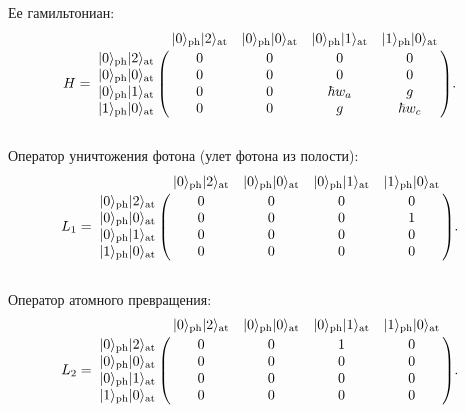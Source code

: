 \noindent Ее гамильтониан:\\
{\normalsize
	\[
	H = \bordermatrix
	{
		&                |0\ra_{\text{\text{ph}}}|2\ra_{\text{\text{at}}} & |0\ra_{\text{\text{ph}}}|0\ra_{\text{\text{at}}} & |0\ra_{\text{\text{ph}}}|1\ra_{\text{\text{at}}} & |1\ra_{\text{\text{ph}}}|0\ra_{\text{\text{at}}} \cr
		|0\ra_{\text{\text{ph}}}|2\ra_{\text{\text{at}}} &      0 &       	   0 &      0 & 0 \cr
		|0\ra_{\text{\text{ph}}}|0\ra_{\text{\text{at}}} &      0 &       	   0 &      0 & 0\cr
		|0\ra_{\text{\text{ph}}}|1\ra_{\text{\text{at}}} &      0 &  		   0 &      \hbar w_{a} & g\cr
		|1\ra_{\text{\text{ph}}}|0\ra_{\text{\text{at}}} &      0 &      	   0 &      g & \hbar w_{c}\cr
	}.
	\]
}
\
\\[18pt]

\noindent Оператор уничтожения фотона (улет фотона из полости):\\
{\normalsize
	\[
	L_{1} = \bordermatrix
	{
		&                |0\ra_{\text{\text{ph}}}|2\ra_{\text{\text{at}}} & |0\ra_{\text{\text{ph}}}|0\ra_{\text{\text{at}}} & |0\ra_{\text{\text{ph}}}|1\ra_{\text{\text{at}}} & |1\ra_{\text{\text{ph}}}|0\ra_{\text{\text{at}}} \cr
		|0\ra_{\text{\text{ph}}}|2\ra_{\text{\text{at}}} &      0 &      0 &      0 & 0 \cr
		|0\ra_{\text{\text{ph}}}|0\ra_{\text{\text{at}}} &      0 &      0 &      0 & 1\cr
		|0\ra_{\text{\text{ph}}}|1\ra_{\text{\text{at}}} &      0 &      0 &      0 & 0\cr
		|1\ra_{\text{\text{ph}}}|0\ra_{\text{\text{at}}} &      0 &      0 &      0 & 0\cr
	}.
	\]
}
\\

\noindent Оператор атомного превращения:\\
{\normalsize
	\[
	L_{2} = \bordermatrix
	{
		&                |0\ra_{\text{\text{ph}}}|2\ra_{\text{\text{at}}} & |0\ra_{\text{\text{ph}}}|0\ra_{\text{\text{at}}} & |0\ra_{\text{\text{ph}}}|1\ra_{\text{\text{at}}} & |1\ra_{\text{\text{ph}}}|0\ra_{\text{\text{at}}} \cr
		|0\ra_{\text{\text{ph}}}|2\ra_{\text{\text{at}}} &      0 &      0 &      1 & 0 \cr
		|0\ra_{\text{\text{ph}}}|0\ra_{\text{\text{at}}} &      0 &      0 &      0 & 0\cr
		|0\ra_{\text{\text{ph}}}|1\ra_{\text{\text{at}}} &      0 &      0 &      0 & 0\cr
		|1\ra_{\text{\text{ph}}}|0\ra_{\text{\text{at}}} &      0 &      0 &      0 & 0\cr
	}.
	\]
}
\\

